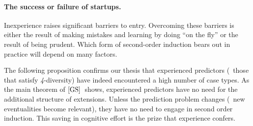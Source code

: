 \documentclass[12pt,a4paper,twoside]{article}
\newcommand{\gsii}{$\textup{[GS]}$}
\newcommand{\fourpru}{\textit{4}-\textup{prudence}}
\newcommand{\fourdiv}{\textit{4}-\textup{diversity}}
\begin{document}
\paragraph{The success or failure of startups. \hskip-7pt} Inexperience raises
significant barriers to entry. Overcoming these barriers is either the result of
making mistakes and learning by doing ``on the fly'' or the result of being
prudent. Which form of second-order induction bears out in practice will depend
on many factors.

The following proposition confirms our thesis that experienced predictors (\ie\
those that satisfy \fourdiv) have indeed encountered a high number of case
types. As the main theorem of \gsii\ shows, experienced predictors have no need
for the additional structure of extensions. Unless the prediction problem
changes (\eg\ new eventualities become relevant),  they have no need to engage in second order induction. This saving in
cognitive effort is the prize that experience confers.
\end{document}
